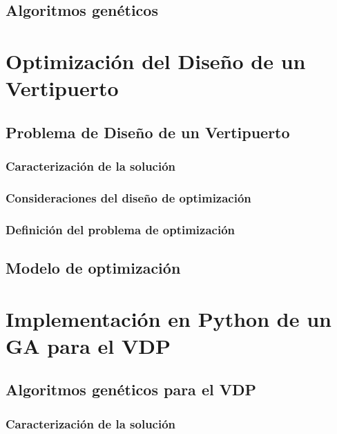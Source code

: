 \documentclass[12pt,a4paper]{book}
\begin{document}
\section{Algoritmos genéticos} \label{Subsec: 3_4}




\chapter{Optimización del Diseño de un Vertipuerto} \label{Capitulo_3}


    

\section{Problema de Diseño de un Vertipuerto}

\subsection{Caracterización de la solución}

\subsection{Consideraciones del diseño de optimización}

\subsection{Definición del problema de optimización}


 
\section{Modelo de optimización}\label{Subsec: 2_2}




\chapter{Implementación en Python de un GA para el VDP} \label{Capítulo 4}




\section{Algoritmos genéticos para el VDP} \label{Subsubsec: 4_2_1}
  
\subsection{Caracterización de la solución}
\end{document}
